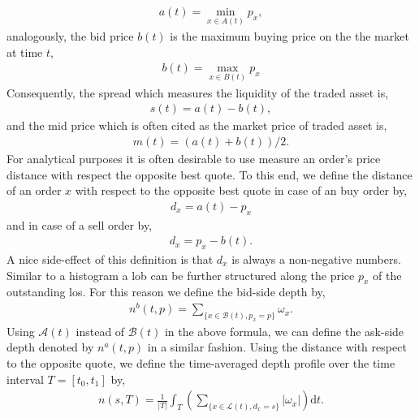 \documentclass[11pt, a4paper]{thesis}  %
\newcommand{\dd}{\textrm{d}}
\begin{document}
%
\begin{eqnarray}
	a(t) = \min_{x\in A(t)} p_x,
	\label{equation:ask_price}
\end{eqnarray}
% 
analogously, the bid price $b(t)$ is the maximum buying price on the the market at time $t$, 
%
\begin{eqnarray}
	b(t) = \max_{x\in B(t)} p_x
	\label{equation:bid_price}
\end{eqnarray}
%
Consequently, the spread which measures the liquidity of the traded asset is,
%
\begin{eqnarray}
	s(t) = a(t)-b(t),
	\label{equation:spread}
\end{eqnarray}
%
and the mid price which is often cited as the market price of traded asset is,
%
\begin{eqnarray}
	m(t) = (a(t)+b(t))/2.
	\label{equation:mid_price}
\end{eqnarray}
%
For analytical purposes it is often desirable to use measure an order's price distance with respect the opposite best quote. To this end, we define the distance of an order $x$ with respect to the opposite best quote in case of an buy order by,
%
\begin{eqnarray}
	\label{equation:distance_opposite_best_quote}
	d_x = a(t) - p_x
\end{eqnarray}
%
and in case of a sell order by,
%
\begin{eqnarray}
	d_x = p_x - b(t).
\end{eqnarray} 
%
A nice side-effect of this definition is that $d_x$ is always a non-negative numbers.
%
Similar to a histogram a \ac{lob} can be further structured along the price $p_x$ of the outstanding \acp{lo}. For this reason we define the bid-side depth by,
%
\begin{eqnarray}
	n^b(t,p) = \sum_{\lbrace x\in \mathcal{B}(t), p_x=p\rbrace } \omega_x.
	\label{equation:depth}
\end{eqnarray}
%
Using $\mathcal{A}(t)$ instead of $\mathcal{B}(t)$ in the above formula, we can define the ask-side depth denoted by $n^a(t,p)$ in a similar fashion. Using the distance with respect to the opposite quote, we define the time-averaged depth profile over the time interval $T=[t_0, t_1]$ by,
%
\begin{eqnarray}
	n(s, T) = \frac{1}{\lvert T\rvert}\int_T
	\left(
		\sum_{\lbrace x\in \mathcal{L}(t), d_x=s\rbrace } \left\lvert\omega_x\right\rvert
	\right) \dd t.
	\label{equation:time_averaged_depth_profile}
\end{eqnarray}
\end{document}
